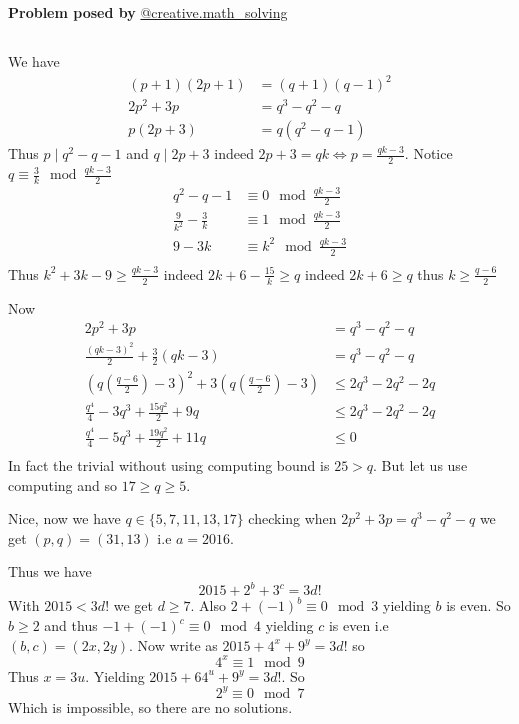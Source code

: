 \documentclass[12pt]{article}
\begin{document}
\begin{flushright}
\textbf{Problem posed by}
\textcolor{RoyalBlue2}{\href{https://www.instagram.com/creative.math_solving/}{@creative.math\_solving}}
\end{flushright}
\subsection*{}
We have 
\begin{align*}
(p+1)(2p+1)&=(q+1)(q-1)^2 \\
2p^2+3p&=q^3-q^2-q \\
p(2p+3)&=q(q^2-q-1)
\end{align*}
Thus $p\mid q^2-q-1$ and $q\mid 2p+3$ indeed $2p+3=qk\iff p=\frac{qk-3}{2}$. Notice $q\equiv \frac{3}{k} \mod \frac{qk-3}{2}$
\begin{align*}
q^2-q-1&\equiv 0\mod \frac{qk-3}{2} \\
\frac{9}{k^2}-\frac{3}{k} &\equiv 1\mod \frac{qk-3}{2} \\
9-3k &\equiv k^2\mod \frac{qk-3}{2} \\
\end{align*}
Thus $k^2+3k-9\ge \frac{qk-3}{2}$ indeed $2k+6-\frac{15}{k}\ge q$ indeed $2k+6\ge q$ thus $k\ge \frac{q-6}{2}$

Now 
\begin{align*}
2p^2+3p&=q^3-q^2-q \\
\frac{(qk-3)^2}{2}+\frac{3}{2} (qk-3) &= q^3-q^2-q \\
(q\left(\frac{q-6}{2}\right)-3)^2+3(q\left(\frac{q-6}{2}\right)-3) &\le 2q^3-2q^2-2q \\
\frac{q^4}{4}-3q^3+\frac{15q^2}{2}+9q &\le 2q^3-2q^2-2q \\
\frac{q^4}{4}-5q^3+\frac{19q^2}{2}+11q &\le 0 \\
\end{align*}
In fact the trivial without using computing bound is $25>q$. But let us use computing and so $17\ge q\ge 5$.

Nice, now we have $q\in\{5,7,11,13,17\}$ checking when $2p^2+3p=q^3-q^2-q$ we get $(p,q)=(31,13)$ i.e $a=2016$.


Thus we have
$$2015+2^b+3^c=3d!$$
With $2015<3d!$ we get $d\ge 7$. Also $2+(-1)^b\equiv 0\mod 3$ yielding $b$ is even. So $b\ge 2$ and thus $-1+(-1)^c\equiv 0\mod 4$ yielding $c$ is even i.e $(b,c)=(2x,2y)$. Now write as $2015+4^x+9^y=3d!$ so
$$4^x\equiv 1\mod 9$$
Thus $x=3u$. Yielding $2015+64^u+9^y=3d!$. So
$$2^{y}\equiv 0 \mod 7$$
Which is impossible, so there are no solutions.
\end{document}
